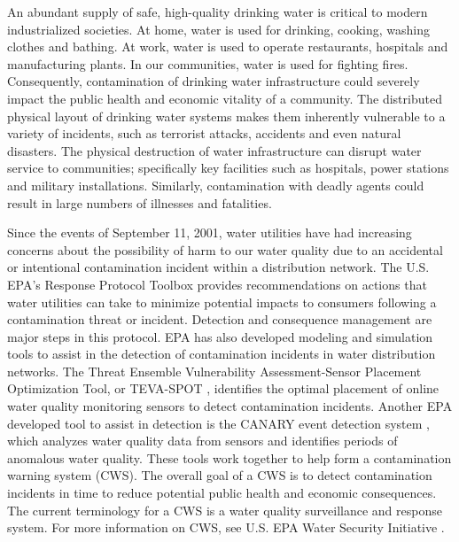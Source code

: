 An abundant supply of safe, high-quality drinking water is critical to modern industrialized societies. 
At home, water is used for drinking, cooking, washing clothes and bathing. At work, water 
is used to operate restaurants, hospitals and manufacturing plants. In our communities, 
water is used for fighting fires. Consequently, contamination of drinking 
water infrastructure could severely impact the public health and economic vitality of a community. 
The distributed physical layout of drinking water systems makes them inherently vulnerable to a variety 
of incidents, such as terrorist attacks, accidents and even natural disasters. 
The physical destruction of water infrastructure can disrupt water service to communities; 
specifically key facilities such as hospitals, power stations and military installations. Similarly, 
contamination with deadly agents could result in large numbers of illnesses and fatalities.

Since the events of September 11, 2001, water utilities have had increasing concerns about 
the possibility of harm to our water quality due to an accidental or intentional contamination incident within a distribution network. 
The U.S. EPA's Response Protocol Toolbox \citep{ResponseProtocolToolbox} provides recommendations on actions that 
water utilities can take to minimize potential impacts to consumers following a contamination threat or incident. 
Detection and consequence management are major steps in this protocol. EPA has also developed modeling and 
simulation tools to assist in the detection of contamination incidents in water distribution networks. 
The Threat Ensemble Vulnerability Assessment-Sensor Placement Optimization Tool, or TEVA-SPOT \citep{TEVASPOTusermanual}, 
identifies the optimal placement of online water quality monitoring sensors to detect contamination incidents. 
Another EPA developed tool to assist in detection is the CANARY event detection system \citep{CANARY}, 
which analyzes water quality data from sensors and identifies periods of anomalous water quality. 
These tools work together to help form a contamination warning system (CWS). The overall goal of a 
CWS is to detect contamination incidents in time to reduce potential public health and economic consequences. 
The current terminology for a CWS is a water quality surveillance and response system. For more information 
on CWS, see U.S. EPA Water Security Initiative \citep{WSI}.

